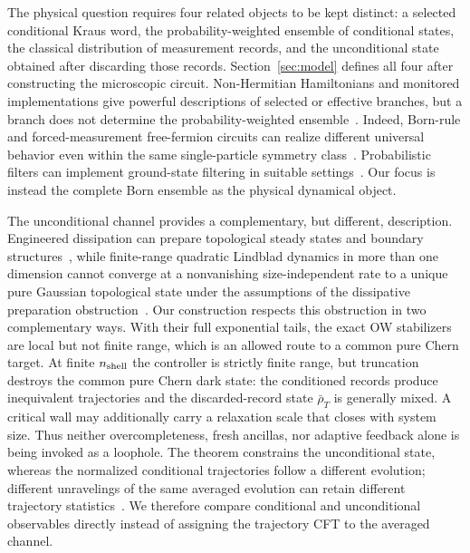 \documentclass[aps,prx,twocolumn,superscriptaddress,longbibliography,nofootinbib,floatfix]{revtex4-2}
\begin{document}
The physical question requires four related objects to be kept distinct: a selected conditional Kraus word, the probability-weighted ensemble of conditional states, the classical distribution of measurement records, and the unconditional state obtained after discarding those records.  Section~\ref{sec:model} defines all four after constructing the microscopic circuit.  Non-Hermitian Hamiltonians and monitored implementations give powerful descriptions of selected or effective branches, but a branch does not determine the probability-weighted ensemble~\cite{ChaduteauLeeSchindler2026,Fleckenstein2022}.  Indeed, Born-rule and forced-measurement free-fermion circuits can realize different universal behavior even within the same single-particle symmetry class~\cite{JianShapourian2023,Leung2025}.  Probabilistic filters can implement ground-state filtering in suitable settings~\cite{Kosugi2022}.  Our focus is instead the complete Born ensemble as the physical dynamical object.

The unconditional channel provides a complementary, but different, description.  Engineered dissipation can prepare topological steady states and boundary structures~\cite{Bardyn2013,Budich2015,YangMoligniniBergholtz2023}, while finite-range quadratic Lindblad dynamics in more than one dimension cannot converge at a nonvanishing size-independent rate to a unique pure Gaussian topological state under the assumptions of the dissipative preparation obstruction~\cite{Goldstein2019}.  Our construction respects this obstruction in two complementary ways.  With their full exponential tails, the exact OW stabilizers are local but not finite range, which is an allowed route to a common pure Chern target.  At finite $n_{\rm shell}$ the controller is strictly finite range, but truncation destroys the common pure Chern dark state: the conditioned records produce inequivalent trajectories and the discarded-record state $\bar\rho_T$ is generally mixed.  A critical wall may additionally carry a relaxation scale that closes with system size.  Thus neither overcompleteness, fresh ancillas, nor adaptive feedback alone is being invoked as a loophole.  The theorem constrains the unconditional state, whereas the normalized conditional trajectories follow a different evolution; different unravelings of the same averaged evolution can retain different trajectory statistics~\cite{PiccittoRossiniRussomanno2024}.  We therefore compare conditional and unconditional observables directly instead of assigning the trajectory CFT to the averaged channel.
\end{document}
